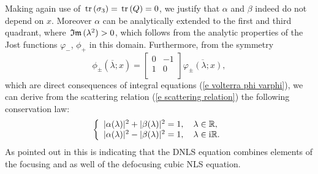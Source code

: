 Making again use of $\,\text{tr}\,(\sigma_3)=\,\text{tr}\,(Q)=0$, we justify that $\alpha$ and $\beta$ indeed do not depend on $x$. Moreover $\alpha$ can be analytically extended to the first and third quadrant, where $\,\mathfrak{Im}\,(\lambda^2)>0$, which follows from the analytic properties of the Jost functions $\varphi_{-}$, $\phi_{+}$ in this domain. Furthermore, from the symmetry
\begin{equation}\label{e symmetries phi varphi 2}
    \phi_{\pm}(\overline{\lambda};x)=
    \left[
      \begin{array}{cc}
        0 & -1 \\
        1 & 0 \\
      \end{array}
    \right]\overline{\varphi_{\pm}(\lambda;x)},
\end{equation}
which are direct consequences of integral equations (\ref{e volterra phi varphi}), we can derive from the scattering relation (\ref{e scattering relation}) the following conservation law:
\begin{equation}\label{e alpha^2+beta^2}
    \left\{
      \begin{array}{ll}
        |\alpha(\lambda)|^2+|\beta(\lambda)|^2=1, \quad\lambda\in\mathbb R,\\
        |\alpha(\lambda)|^2-|\beta(\lambda)|^2=1, \quad\lambda\in\mathrm{i}\mathbb R.
      \end{array}
    \right.
\end{equation}
As pointed out in \cite{Pelinovsky2016} this is indicating that the DNLS equation combines elements of the focusing and as well of the defocusing cubic NLS equation.

